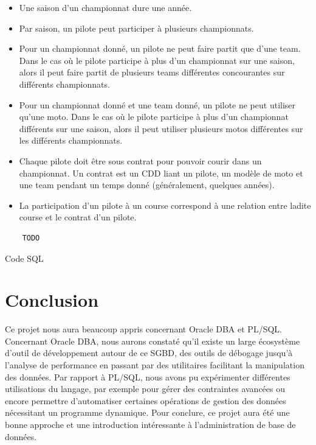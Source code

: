 \documentclass[12pt,a4paper]{article}
\begin{document}
\begin{itemize}
    \item Une saison d'un championnat dure une année.

    \item Par saison, un pilote peut participer à plusieurs championnats.

    \item Pour un championnat donné, un pilote ne peut faire partit que d'une
        team. Dans le cas où le pilote participe à plus d'un championnat sur une
        saison, alors il peut faire partit de plusieurs teams différentes
        concourantes sur différents championnats.

    \item Pour un championnat donné et une team donné, un pilote ne peut
        utiliser qu'une moto. Dans le cas où le pilote participe à plus d'un
        championnat différents sur une saison, alors il peut utiliser plusieurs
        motos différentes sur les différents championnats.

    \item Chaque pilote doit être sous contrat pour pouvoir courir dans un
        championnat. Un contrat est  un CDD liant un pilote, un modèle de moto
        et une team pendant un temps donné (généralement, quelques années).

    \item La participation d’un pilote à un course correspond à une relation
        entre ladite course et le contrat d’un pilote.
\end{itemize}

\begin{listing}
    \begin{verbatim}
    TODO
    \end{verbatim}
    \caption{Code SQL}
    \label{lst.sql}
\end{listing}

\section{Conclusion}
\label{sec.conc}

Ce projet nous aura beaucoup appris concernant Oracle DBA et PL/SQL. Concernant
Oracle DBA, nous aurons constaté qu’il existe un large écosystème d’outil de
développement autour de ce SGBD, des outils de débogage jusqu’à l’analyse de
performance en passant par des utilitaires facilitant la manipulation des
données. Par rapport à PL/SQL, nous avons pu expérimenter différentes
utilisations du langage, par exemple pour gérer des contraintes avancées ou
encore permettre d’automatiser certaines opérations de gestion des données
nécessitant un programme dynamique. Pour conclure, ce projet aura été une bonne
approche et une introduction intéressante à l’administration de base de données.
\end{document}
